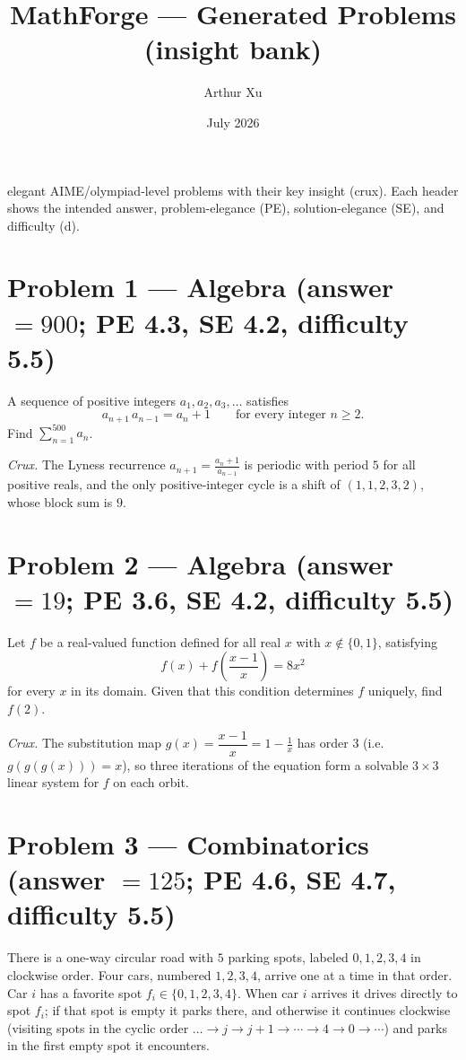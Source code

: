 \documentclass[11pt]{article}
\title{MathForge --- Generated Problems (insight bank)}
\author{Arthur Xu}\date{July 2026}
\begin{document}
\maketitle

 elegant AIME/olympiad-level problems with their key insight (crux). Each header shows the intended answer, problem-elegance (PE), solution-elegance (SE), and difficulty (d).

\bigskip

\section*{Problem 1 --- Algebra \quad (answer $=900$; PE 4.3, SE 4.2, difficulty 5.5)}

A sequence of positive integers $a_1, a_2, a_3, \dots$ satisfies
$$a_{n+1}\,a_{n-1} = a_n + 1 \qquad \text{for every integer } n \ge 2.$$
Find $\displaystyle\sum_{n=1}^{500} a_n$.

\medskip

\textit{Crux.} The Lyness recurrence $a_{n+1}=\frac{a_n+1}{a_{n-1}}$ is periodic with period $5$ for all positive reals, and the only positive-integer cycle is a shift of $(1,1,2,3,2)$, whose block sum is $9$.

\section*{Problem 2 --- Algebra \quad (answer $=19$; PE 3.6, SE 4.2, difficulty 5.5)}

Let $f$ be a real-valued function defined for all real $x$ with $x \notin \{0,1\}$, satisfying
$$f(x) + f\!\left(\frac{x-1}{x}\right) = 8x^2$$
for every $x$ in its domain. Given that this condition determines $f$ uniquely, find $f(2)$.

\medskip

\textit{Crux.} The substitution map $g(x)=\dfrac{x-1}{x}=1-\tfrac1x$ has order $3$ (i.e. $g(g(g(x)))=x$), so three iterations of the equation form a solvable $3\times3$ linear system for $f$ on each orbit.

\section*{Problem 3 --- Combinatorics \quad (answer $=125$; PE 4.6, SE 4.7, difficulty 5.5)}

There is a one-way circular road with $5$ parking spots, labeled $0,1,2,3,4$ in clockwise order. Four cars, numbered $1,2,3,4$, arrive one at a time in that order. Car $i$ has a favorite spot $f_i \in \{0,1,2,3,4\}$. When car $i$ arrives it drives directly to spot $f_i$; if that spot is empty it parks there, and otherwise it continues clockwise (visiting spots in the cyclic order $\ldots \to j \to j+1 \to \cdots \to 4 \to 0 \to \cdots$) and parks in the first empty spot it encounters.
\end{document}
